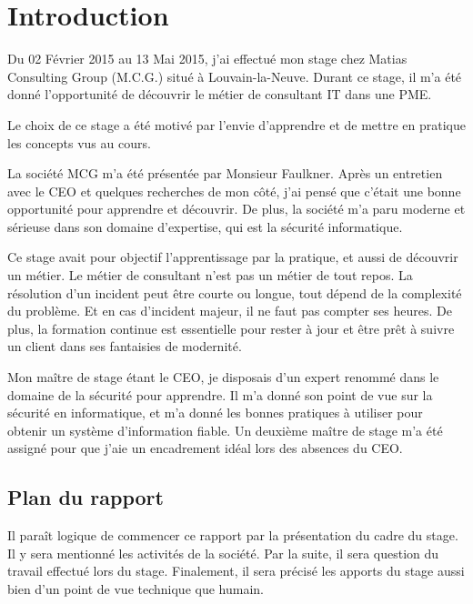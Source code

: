 \chapter*{Introduction}
Du 02 Février 2015 au 13 Mai 2015, j'ai effectué mon stage chez Matias Consulting Group (M.C.G.) situé à Louvain-la-Neuve.
Durant ce stage, il m'a été donné l'opportunité de découvrir le métier de consultant IT dans une PME.

Le choix de ce stage a été motivé par l'envie d'apprendre et de mettre en pratique les concepts vus au cours.

La société MCG m'a été présentée par Monsieur Faulkner.
Après un entretien avec le CEO et quelques recherches de mon côté, j'ai pensé que c'était une bonne opportunité pour apprendre et découvrir. 
De plus, la société m'a paru moderne et sérieuse dans son domaine d'expertise, qui est la sécurité informatique.

Ce stage avait pour objectif l'apprentissage par la pratique, et aussi de découvrir un métier.
Le métier de consultant n'est pas un métier de tout repos.
La résolution d'un incident peut être courte ou longue, tout dépend de la complexité du problème.
Et en cas d'incident majeur, il ne faut pas compter ses heures.
De plus, la formation continue est essentielle pour rester à jour et être prêt à suivre un client dans ses fantaisies de modernité. 

Mon maître de stage étant le CEO, je disposais d'un expert renommé dans le domaine de la sécurité pour apprendre.
Il m'a donné son point de vue sur la sécurité en informatique, et m'a donné les bonnes pratiques à utiliser pour obtenir un système d'information fiable.
Un deuxième maître de stage m'a été assigné pour que j'aie un encadrement idéal lors des absences du CEO. 

\section*{Plan du rapport}
Il paraît logique de commencer ce rapport par la présentation du cadre du stage.
Il y sera mentionné les activités de la société.
Par la suite, il sera question du travail effectué lors du stage.
Finalement, il sera précisé les apports du stage aussi bien d'un point de vue technique que humain.